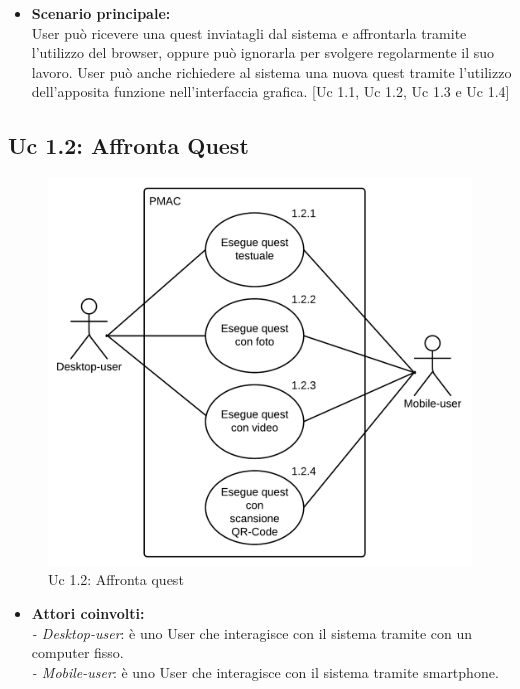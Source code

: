 {\begin{itemize}
\item \textbf{Scenario principale:}\\
User può ricevere una quest inviatagli dal sistema e affrontarla tramite l'utilizzo del browser, oppure può ignorarla per svolgere regolarmente il suo lavoro. User può anche richiedere al sistema una nuova quest tramite l'utilizzo dell'apposita funzione nell'interfaccia grafica. [Uc 1.1, Uc 1.2, Uc 1.3 e Uc 1.4]
\end{itemize}
\newpage

\subsection{Uc 1.2: Affronta Quest}
\begin{figure}[ht]
\centering
\caption{Uc 1.2: Affronta quest}
\includegraphics[scale=0.87]{images/cap1/UseCase/Uc1_2} %
\end{figure}

\begin{itemize}

\item \textbf{Attori coinvolti:}\\
\emph{- Desktop-user}: è uno User che interagisce con il sistema tramite con un computer fisso.\\
\emph{- Mobile-user}: è uno User che interagisce con il sistema tramite smartphone.


\end{itemize}}
